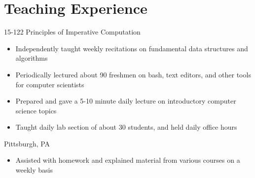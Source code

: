 \documentclass[11pt,letterpaper,sans,final]{moderncv}
\begin{document}
\section{Teaching Experience}
    {15-122 Principles of Imperative Computation}{}{}
    {
      \begin{itemize}
        \item Independently taught weekly recitations on fundamental data
          structures and algorithms
      \end{itemize}
    }
    {
      \begin{itemize}
        \item Periodically lectured about 90 freshmen on bash, text editors,
          and other tools for computer scientists
      \end{itemize}
    }
    {
      \begin{itemize}
        \item Prepared and gave a 5-10 minute daily lecture on
          introductory computer science topics
        \item Taught daily lab section of about 30 students, and held daily
          office hours
      \end{itemize}
    }
    {Pittsburgh, PA}{}{
    \begin{itemize}
      \item Assisted with homework and explained material from various courses
        on a weekly basis
    \end{itemize}
    }
\end{document}
